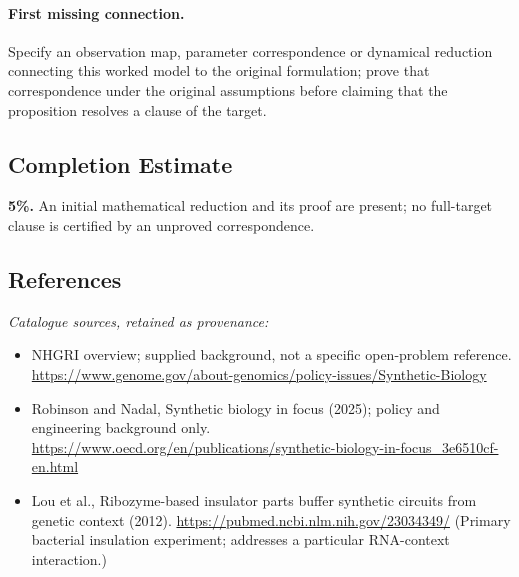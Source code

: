 \documentclass[11pt]{article}
\begin{document}
\paragraph{First missing connection.} Specify an observation map, parameter correspondence or dynamical reduction connecting this worked model to the original formulation; prove that correspondence under the original assumptions before claiming that the proposition resolves a clause of the target.
\subsection{Completion Estimate}
\textbf{5\%.} An initial mathematical reduction and its proof are present; no full-target clause is certified by an unproved correspondence.
\subsection{References}
\noindent\emph{Catalogue sources, retained as provenance:}
\begin{itemize}
\item NHGRI overview; supplied background, not a specific open-problem reference. \url{https://www.genome.gov/about-genomics/policy-issues/Synthetic-Biology}
\item Robinson and Nadal, Synthetic biology in focus (2025); policy and engineering background only. \url{https://www.oecd.org/en/publications/synthetic-biology-in-focus_3e6510cf-en.html}
\item Lou et al., Ribozyme-based insulator parts buffer synthetic circuits from genetic context (2012). \url{https://pubmed.ncbi.nlm.nih.gov/23034349/} (Primary bacterial insulation experiment; addresses a particular RNA-context interaction.)
\end{itemize}
\clearpage


\appendix
\end{document}

